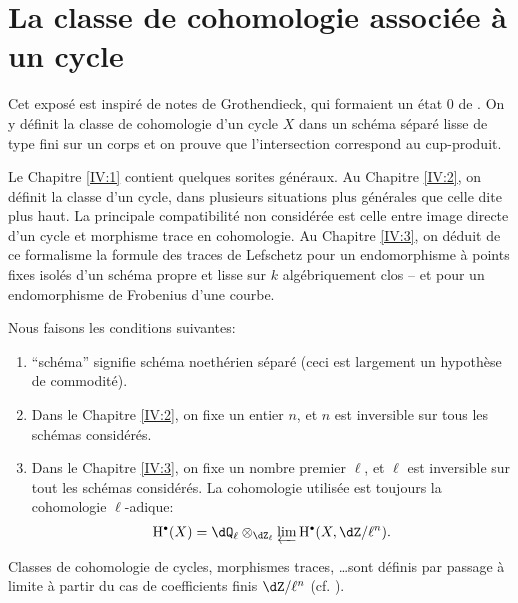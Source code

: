 
\chapter{La classe de cohomologie associée à un cycle}\label{IV}




Cet exposé est inspiré de notes de Grothendieck, qui formaient un état 0 
de \cite[IV]{sga5}. On y définit la classe de cohomologie d'un cycle $X$ dans 
un schéma séparé lisse de type fini sur un corps et on prouve que 
l'intersection correspond au cup-produit.

Le Chapitre \ref{IV:1} contient quelques sorites généraux. Au Chapitre \ref{IV:2}, on 
définit la classe d'un cycle, dans plusieurs situations plus générales 
que celle dite plus haut. La principale compatibilité non considérée est 
celle entre image directe d'un cycle et morphisme trace en cohomologie. Au 
Chapitre \ref{IV:3}, on déduit de ce formalisme la formule des traces de Lefschetz pour 
un endomorphisme à points fixes isolés d'un schéma propre et lisse sur $k$ 
algébriquement clos -- et pour un endomorphisme de Frobenius d'une courbe. 

Nous faisons les conditions suivantes:
\begin{enumerate}[\indent 1)]
  \item ``schéma'' signifie schéma noethérien séparé (ceci est 
    largement un hypothèse de commodité).
  \item Dans le Chapitre \ref{IV:2}, on fixe un entier $n$, et $n$ est inversible sur 
    tous les schémas considérés.
  \item Dans le Chapitre \ref{IV:3}, on fixe un nombre premier $\ell$, et $\ell$ est 
    inversible sur tout les schémas considérés. La cohomologie utilisée 
    est toujours la cohomologie $\ell$-adique:
    \[
      \h^\bullet(X) = \dQ_\ell\otimes_{\dZ_\ell} \varprojlim \h^\bullet(X,\dZ/\ell^n) \text{.}
    \]
\end{enumerate}
Classes de cohomologie de cycles, morphismes traces, \ldots sont définis par 
passage à limite à partir du cas de coefficients finis $\dZ/\ell^n$ (cf. 
\cite[VI]{sga5}).




















